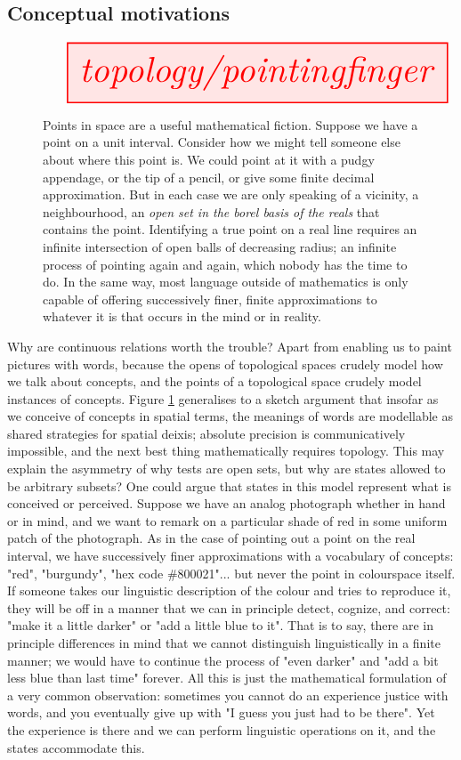 \begin{marginfigure}
\subsection{Conceptual motivations}

\begin{figure}[h!]\label{fig:pointing}
\[\resizebox{\textwidth}{!}{\tikzfig{topology/pointingfinger}}\]
\caption{Points in space are a useful mathematical fiction. Suppose we have a point on a unit interval. Consider how we might tell someone else about where this point is. We could point at it with a pudgy appendage, or the tip of a pencil, or give some finite decimal approximation. But in each case we are only speaking of a vicinity, a neighbourhood, an \emph{open set in the borel basis of the reals} that contains the point. Identifying a true point on a real line requires an infinite intersection of open balls of decreasing radius; an infinite process of pointing again and again, which nobody has the time to do. In the same way, most language outside of mathematics is only capable of offering successively finer, finite approximations to whatever it is that occurs in the mind or in reality.}
\end{figure}

Why are continuous relations worth the trouble? Apart from enabling us to paint pictures with words, because the opens of topological spaces crudely model how we talk about concepts, and the points of a topological space crudely model instances of concepts. Figure \ref{fig:pointing} generalises to a sketch argument that insofar as we conceive of concepts in spatial terms, the meanings of words are modellable as shared strategies for spatial deixis; absolute precision is communicatively impossible, and the next best thing mathematically requires topology. This may explain the asymmetry of why tests are open sets, but why are states allowed to be arbitrary subsets? One could argue that states in this model represent what is conceived or perceived. Suppose we have an analog photograph whether in hand or in mind, and we want to remark on a particular shade of red in some uniform patch of the photograph. As in the case of pointing out a point on the real interval, we have successively finer approximations with a vocabulary of concepts: "red", "burgundy", "hex code \#800021"... but never the point in colourspace itself. If someone takes our linguistic description of the colour and tries to reproduce it, they will be off in a manner that we can in principle detect, cognize, and correct: "make it a little darker" or "add a little blue to it". That is to say, there are in principle differences in mind that we cannot distinguish linguistically in a finite manner; we would have to continue the process of "even darker" and "add a bit less blue than last time" forever. All this is just the mathematical formulation of a very common observation: sometimes you cannot do an experience justice with words, and you eventually give up with "I guess you just had to be there". Yet the experience is there and we can perform linguistic operations on it, and the states accommodate this.


\end{marginfigure}
